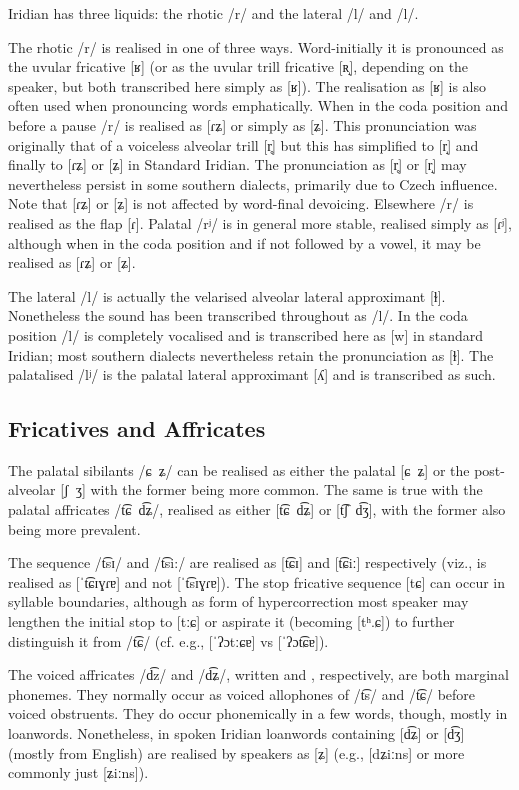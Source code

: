 Iridian has three liquids: the rhotic /r/ and the lateral /l/ and /l/.

The rhotic /r/ is realised in one of three ways. Word-initially it is pronounced as the uvular fricative [ʁ] (or as the uvular trill fricative [ʀ̝], depending on the speaker, but both transcribed here simply as [ʁ]). The realisation as [ʁ] is also often used when pronouncing words emphatically. When in the coda position and before a pause /r/ is realised as [ɾʑ] or simply as [ʑ]. This pronunciation was originally that of a voiceless alveolar trill [r̥] but this has simplified to [r̝] and finally to [ɾʑ] or [ʑ] in Standard Iridian. The  pronunciation as [r̥] or [r̝] may nevertheless persist in some southern dialects, primarily due to Czech influence. Note that [ɾʑ] or [ʑ] is not affected by word-final devoicing. Elsewhere /r/ is realised as the flap [ɾ]. Palatal /rʲ/ is in general more stable, realised simply as [ɾʲ], although when in the coda position and if not followed by a vowel, it may be realised as [ɾʑ] or [ʑ].

The lateral /l/ is actually the velarised alveolar lateral approximant [ɫ]. Nonetheless the sound has been transcribed throughout as /l/. In the coda position /l/ is completely vocalised and is transcribed here as [w] in standard Iridian; most southern dialects nevertheless retain the pronunciation as [ɫ]. The palatalised /lʲ/ is the palatal lateral approximant [ʎ] and is transcribed as such.

\subsection{Fricatives and Affricates}

The palatal sibilants /ɕ~ʑ/ can be realised as either the palatal [ɕ~ʑ] or
the post-alveolar [ʃ~ʒ] with the former being more common. The same is true
with the palatal affricates /t͡ɕ~d͡ʑ/, realised as either [t͡ɕ~d͡ʑ] or [t͡ʃ~d͡ʒ],
with the former also being more prevalent.

The sequence /t͡sɪ/ and /t͡si:/ are realised as [t͡ɕɪ] and [t͡ɕiː] respectively
(viz.,  is realised as [ˈt͡ɕɪɣɾɐ] and not [ˈt͡sɪɣɾɐ]).
The stop fricative sequence [tɕ] can occur in syllable boundaries,
although as form of hypercorrection most speaker may lengthen the initial
stop to [tːɕ] or aspirate it (becoming [tʰ.ɕ]) to further distinguish it
from /t͡ɕ/ (cf. e.g.,  [ˈʔɔtːɕɐ] vs 
[ˈʔɔt͡ɕɐ]).

The voiced affricates /d͡z/ and /d͡ʑ/, written  and , respectively, are both marginal phonemes. They normally occur as voiced allophones of  /t͡s/ and /t͡ɕ/ before voiced obstruents. They do occur phonemically in a few words, though, mostly in loanwords. Nonetheless, in spoken Iridian loanwords containing [d͡ʑ] or [d͡ʒ] (mostly from English) are realised by speakers as [ʑ] (e.g.,  [dʑiːns] or more commonly just [ʑiːns]).


